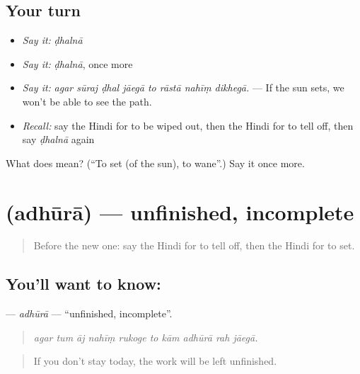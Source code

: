 \subsection*{Your turn}
\begin{itemize}
\raggedright
  \item \emph{Say it:} \emph{ḍhalnā}
  \item \emph{Say it:} \emph{ḍhalnā}, once more
  \item \emph{Say it:} \emph{agar sūraj ḍhal jāegā to rāstā nahīṃ dikhegā.} — If the sun sets, we won't be able to see the path.
  \item \emph{Recall:} say the Hindi for to be wiped out, then the Hindi for to tell off, then say \emph{ḍhalnā} again
\end{itemize}

\begin{tcolorbox}[breakable,colback=teal!4,colframe=teal!35!black,title={Before you move on}]
What does  mean? (\textquotedblleft{}To set (of the sun), to wane\textquotedblright{}.) Say it once more.
\end{tcolorbox}
\section[\texorpdfstring{\hi{अधूरा} (adhūrā)}{अधूरा (adhūrā)}]{ (adhūrā) — unfinished, incomplete}

\label{lesson:HI-C385-adhura}



\begin{quote}
Before the new one: say the Hindi for to tell off, then the Hindi for to set.
\end{quote}

\subsection*{You'll want to know: }
\textbf{} — \emph{adhūrā} — \textquotedblleft{}unfinished, incomplete\textquotedblright{}.

\begin{quote}
         
\end{quote}

\begin{quote}
\emph{agar tum āj nahīṃ rukoge to kām adhūrā rah jāegā.}
\end{quote}

\begin{quote}
If you don't stay today, the work will be left unfinished.
\end{quote}

